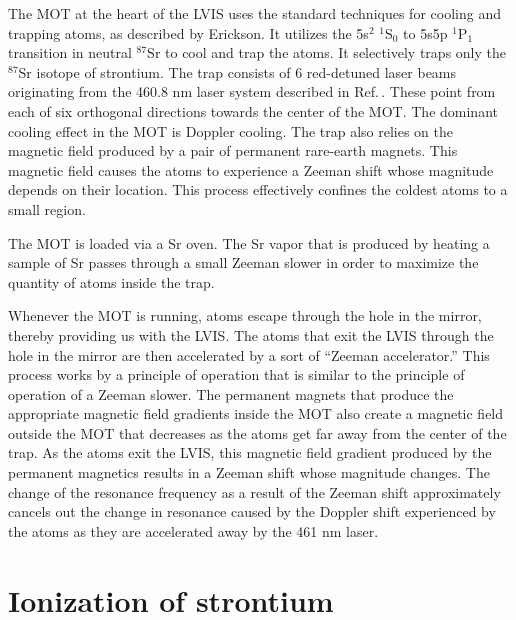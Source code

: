 The MOT at the heart of the LVIS uses the standard techniques for cooling and trapping atoms, as described by Erickson\cite{cjeDiss}. It utilizes the 5s$^2$ $^1$S$_0$ to 5s5p $^1$P$_1$ transition in neutral $^{87}$Sr to cool and trap the atoms. It selectively traps only the $^{87}$Sr isotope of strontium. The trap consists of 6 red-detuned laser beams originating from the 460.8 nm laser system described in Ref.\,\cite{cjeDiss}. These point from each of six orthogonal directions towards the center of the MOT. The dominant cooling effect in the MOT is Doppler cooling. 
The trap also relies on the magnetic field produced by a pair of permanent rare-earth magnets. This magnetic field causes the atoms to experience a Zeeman shift whose magnitude depends on their location. This process effectively confines the coldest atoms to a small region. 

The MOT is loaded via a Sr oven. The Sr vapor that is produced by heating a sample of Sr passes through a small Zeeman slower in order to maximize the quantity of atoms inside the trap. 



Whenever the MOT is running, atoms escape through the hole in the mirror, thereby providing us with the LVIS. The atoms that exit the LVIS through the hole in the mirror are then accelerated by a sort of ``Zeeman accelerator.'' This process works by a principle of operation that is similar to the principle of operation of a Zeeman slower. The permanent magnets that produce the appropriate magnetic field gradients inside the MOT also create a magnetic field outside the MOT that decreases as the atoms get far away from the center of the trap. As the atoms exit the LVIS, this magnetic field gradient produced by the permanent magnetics results in a Zeeman shift whose magnitude changes. The change of the resonance frequency as a result of the Zeeman shift approximately cancels out the change in resonance caused by the Doppler shift experienced by the atoms as they are accelerated away by the 461 nm laser. 

\section{Ionization of strontium}
 
